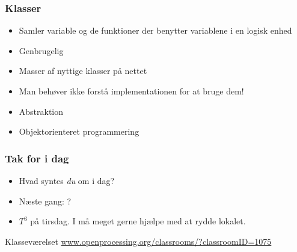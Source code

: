 \documentclass{beamer}
\begin{document}
\begin{frame}
  \frametitle{Klasser}

  \begin{itemize}
  \item Samler variable og de funktioner der benytter variablene i en logisk enhed
  \item Genbrugelig
  \item Masser af nyttige klasser på nettet
  \item Man behøver ikke forstå implementationen for at bruge dem! 
  \item Abstraktion
  \item Objektorienteret programmering
  \end{itemize}

\end{frame}


\begin{frame}
  \frametitle{Tak for i dag}

  \begin{itemize}
  \item Hvad syntes \emph{du} om i dag?
  \item Næste gang: ?
  \item $T^3$ på tirsdag. I må meget gerne hjælpe med at rydde lokalet.
  \end{itemize}

  \begin{block}{Klasseværelset}
    \url{www.openprocessing.org/classrooms/?classroomID=1075}
  \end{block}

\end{frame}
\end{document}
